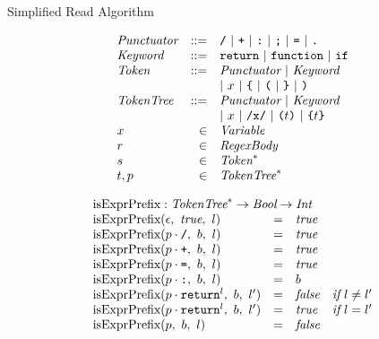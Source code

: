 \documentclass[onecolumn]{sigplanconf-onecolumn}
\begin{document}
\begin{displayfigure*}{\label{fig:simpleread}Simplified Read Algorithm}
\begin{minipage}[t]{0.5\linewidth}
\[
\begin{array}{lrl}
  \textit{Punctuator} &::=& \texttt{/} ~|~ \texttt{+} ~|~ \texttt{:} ~|~
  \texttt{;} ~|~ \texttt{=} ~|~ \texttt{.}
  \\
  \textit{Keyword} &::=& \texttt{return} ~|~ \texttt{function}~|~
  \texttt{if}
  \\
  \textit{Token} &::=& \textit{Punctuator} ~|~ \textit{Keyword}
  \\
  && |~ x ~|~ \texttt{\{} ~|~ \texttt{(} ~|~ 
  \texttt {\}} ~|~  \texttt{)}
  \\
  \textit{TokenTree} &::=& \textit{Punctuator} ~|~ \textit{Keyword}
  \\
  &&|~ x ~|~ \texttt{/x/} ~|~ \texttt{(}t\texttt{)} ~|~ \texttt{\{}t\texttt{\}}
  \\
  x &\in& \textit{Variable}
  \\
  r &\in& \textit{RegexBody}
  \\
  s &\in& \textit{Token}^{*}
  \\
  t,p &\in& \textit{TokenTree}^{*}
\end{array}
\]
\end{minipage}
\begin{minipage}[t]{0.5\linewidth}
\[
  \begin{array}{lcll}
    \multicolumn{3}{l}{\textrm{isExprPrefix} : \TT^{*} \rightarrow
      \textit{Bool} \rightarrow \textit{Int}}
    \\
    \isobject(\epsilon,~\textit{true},~l) &=& \textit{true}
    \\
    \isobject(p \cdot \div,~b,~l) &=& \textit{true}
    \\
    \isobject(p \cdot \texttt{+},~b,~l) &=& \textit{true}
    \\
    \isobject(p \cdot \texttt{=},~b,~l) &=& \textit{true}
    \\
    \isobject(p \cdot \texttt{:},~b,~l) &=& b
    \\
    \isobject(p \cdot \texttt{return}^{l},~b,~l') &=& \textit{false} 
    & \textit{if}~l \not = l'
    \\
    \isobject(p \cdot \texttt{return}^{l},~b,~l') &=& \textit{true} 
    & \textit{if}~l = l'
    \\
    \isobject(p ,~b,~l) &=& \textit{false}
    \\
  \end{array}
\]
\end{minipage}
\[
  \begin{array}{lcll}

\end{array}\]
\end{displayfigure*}
\end{document}
